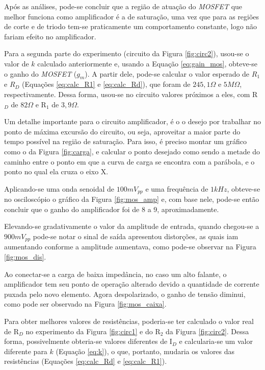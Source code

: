 \documentclass{article}
\begin{document}
Após as análises, pode-se concluir que a região de atuação do \emph{MOSFET} que melhor funciona como amplificador é a de saturação, uma vez que para as regiões de corte e de triodo tem-se praticamente um comportamento constante, logo não fariam efeito no amplificador.

Para a segunda parte do experimento (circuito da Figura \ref{fig:circ2}), usou-se o valor de $k$ calculado anteriormente e, usando a Equação \ref{eq:gain_mos}, obteve-se o ganho do \emph{MOSFET} ($g_m$). A partir dele, pode-se calcular o valor esperado de $R_1$ e $R_D$ (Equações \ref{eq:calc_R1} e \ref{eq:calc_Rd}), que foram de $245,1 \Omega$ e $5M \Omega$, respectivamente. Dessa forma, usou-se no circuito valores próximos a eles, com R$_D$ de $82 \Omega$ e R$_1$ de $3,9 \Omega$.

Um detalhe importante para o circuito amplificador, é o o desejo por trabalhar no ponto de máxima excursão do circuito, ou seja, aproveitar a maior parte do tempo possível na região de saturação. Para isso, é preciso montar um gráfico como o da Figura \ref{fig:carga}, e calcular o ponto desejado como sendo a metade do caminho entre o ponto em que a curva de carga se encontra com a parábola, e o ponto no qual ela cruza o eixo X.

Aplicando-se uma onda senoidal de $100 mV_{pp}$ e uma frequência de $1kHz$, obteve-se no osciloscópio o gráfico da Figura \ref{fig:mos_amp} e, com base nele, pode-se então concluir que o ganho do amplificador foi de 8 a 9, aproximadamente.

Elevando-se gradativamente o valor da amplitude de entrada, quando chegou-se a $900mV_{pp}$ pode-se notar o sinal de saída apresentou distorções, as quais iam aumentando conforme a amplitude aumentava, como pode-se observar na Figura \ref{fig:mos_dis}.

Ao conectar-se a carga de baixa impedância, no caso um alto falante, o amplificador tem seu ponto de operação alterado devido a quantidade de corrente puxada pelo novo elemento. Agora despolarizado, o ganho de tensão diminui, como pode ser observado na Figura \ref{fig:mos_caixa}.

Para obter melhores valores de resistências, poderia-se ter calculado o valor real de R$_D$ no experimento da Figura \ref{fig:circ1} e do R$_2$ da Figura \ref{fig:circ2}. Dessa forma, possivelmente obteria-se valores diferentes de I$_D$ e calcularia-se um valor diferente para $k$ (Equação \ref{eq:k}), o que, portanto, mudaria os valores das resistências (Equações \ref{eq:calc_Rd} e \ref{eq:calc_R1}). 
\end{document}
